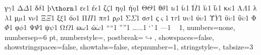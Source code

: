 {		{γ}{{$\gamma$}}1 {Δ}{{$\Delta$}}1 {δ}{{$\delta$}}1 {þ}{{$\thorn$}}1
		{ε}{{$\epsilon$}}1 {έ}{{$\dot \epsilon$}}1 {ζ}{{$\zeta$}}1
		{η}{{$\eta$}}1 {ή}{{$\dot \eta$}}1 {Θ}{{$\Theta$}}1
		{θ}{{$\theta$}}1 {ι}{{$\iota$}}1 {ί}{{$\dot \iota$}}1
		{Ϊ}{{$\ddot I$}}1 {ϊ}{{$\ddot \iota$}}1 {ΐ}{{$\dddot \iota$}}1
		{κ}{{$\kappa$}}1 {Λ}{{$\Lambda$}}1 {λ}{{$\lambda$}}1
		{μ}{{$\mu$}}1 {ν}{{$\nu$}}1 {Ξ}{{$\Xi$}}1 {ξ}{{$\xi$}}1
		{ό}{{$\dot o$}}1 {Π}{{$\Pi$}}1 {π}{{$\pi$}}1 {ρ}{{$\rho$}}1
		{Σ}{{$\Sigma$}}1 {σ}{{$\sigma$}}1 {ς}{{$\varsigma$}}1 {τ}{{$\tau$}}1
		{υ}{{$\upsilon$}}1 {ύ}{{$\dot \upsilon$}}1 {Ϋ}{{$\ddot Y$}}1
		{ϋ}{{$\ddot \upsilon$}}1 {ΰ}{{$\dddot \upsilon$}}1
		{Φ}{{$\Phi$}}1 {φ}{{$\phi$}}1 {Ψ}{{$\Psi$}}1 {ψ}{{$\psi$}}1
		{Ω}{{$\Omega$}}1 {ω}{{$\omega$}}1 {ώ}{{$\dot \omega$}}1
		{“}{{``}}1 {”}{{''}}1 {…}{{$\ldots$}}1 {`}{\`}1 {–}{{--}}1 { }{{ }}1,
	numbers=none,
	numbersep={6 pt},
	numberstyle=\tiny\color{dkgray},
	postbreak=\mbox{$\hookrightarrow$\space},
	showspaces=false,
	showstringspaces=false,
	showtabs=false,
	stepnumber=1,
	stringstyle=\color{mauve},
	tabsize={3}
}
